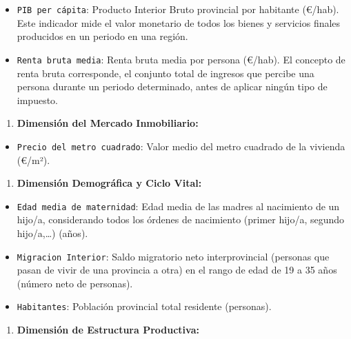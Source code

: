 \documentclass[data,article,submit,moreauthors,pdftex]{Definitions/mdpi}
\providecommand{\tightlist}{%
  \setlength{\itemsep}{0pt}\setlength{\parskip}{0pt}}
\begin{document}
\begin{itemize}
\tightlist
\item
  \texttt{PIB\ per\ cápita}: Producto Interior Bruto provincial por
  habitante (€/hab). Este indicador mide el valor monetario de todos los
  bienes y servicios finales producidos en un periodo en una región.
\item
  \texttt{Renta\ bruta\ media}: Renta bruta media por persona (€/hab).
  El concepto de renta bruta corresponde, el conjunto total de ingresos
  que percibe una persona durante un periodo determinado, antes de
  aplicar ningún tipo de impuesto.
\end{itemize}

\begin{enumerate}
\def\labelenumi{\arabic{enumi}.}
\setcounter{enumi}{1}
\tightlist
\item
  \textbf{Dimensión del Mercado Inmobiliario:}
\end{enumerate}

\begin{itemize}
\tightlist
\item
  \texttt{Precio\ del\ metro\ cuadrado}: Valor medio del metro cuadrado
  de la vivienda (€/m²).
\end{itemize}

\begin{enumerate}
\def\labelenumi{\arabic{enumi}.}
\setcounter{enumi}{2}
\tightlist
\item
  \textbf{Dimensión Demográfica y Ciclo Vital:}
\end{enumerate}

\begin{itemize}
\tightlist
\item
  \texttt{Edad\ media\ de\ maternidad}: Edad media de las madres al
  nacimiento de un hijo/a, considerando todos los órdenes de nacimiento
  (primer hijo/a, segundo hijo/a,\ldots) (años).
\item
  \texttt{Migracion\ Interior}: Saldo migratorio neto interprovincial
  (personas que pasan de vivir de una provincia a otra) en el rango de
  edad de 19 a 35 años (número neto de personas).
\item
  \texttt{Habitantes}: Población provincial total residente (personas).
\end{itemize}

\begin{enumerate}
\def\labelenumi{\arabic{enumi}.}
\setcounter{enumi}{3}
\tightlist
\item
  \textbf{Dimensión de Estructura Productiva:}
\end{enumerate}
\end{document}
